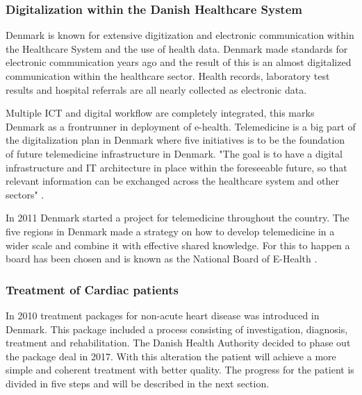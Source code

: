 \subsubsection{Digitalization within the Danish Healthcare System}

Denmark is known for extensive digitization and electronic communication within the Healthcare System and the use of health data. Denmark made standards for electronic communication years ago and the result of this is an almost digitalized communication within the healthcare sector. Health records, laboratory test results and hospital referrals are all nearly collected as electronic data. 

Multiple ICT and digital workflow are completely integrated, this marks Denmark as a frontrunner in deployment of e-health. Telemedicine is a big part of the digitalization plan in Denmark where five initiatives is to be the foundation of future telemedicine infrastructure in Denmark. "The goal is to have a digital infrastructure and IT architecture in place within the foreseeable future, so that relevant information can be exchanged across the healthcare system and other sectors" \cite{Healthcareindk2}.

In 2011 Denmark started a project for telemedicine throughout the country. The five regions in Denmark made a strategy on how to develop telemedicine in a wider scale and combine it with effective shared knowledge. For this to happen a board has been chosen and is known as the National Board of E-Health \cite{DKhealthreview}. %



\subsubsection{Treatment of Cardiac patients}

In 2010 treatment packages for non-acute heart disease was introduced in Denmark. This package included a process consisting of investigation, diagnosis, treatment and rehabilitation. The Danish Health Authority decided to phase out the package deal in 2017. With this alteration the patient will achieve a more simple and coherent treatment with better quality. 
The progress for the patient is divided in five steps and will be described in the next section. \\


